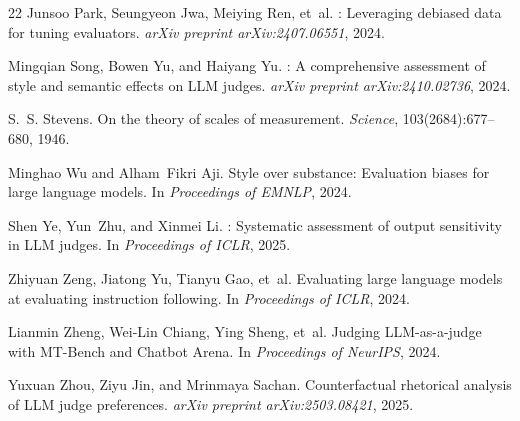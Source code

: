 \documentclass[11pt,a4paper]{article}
\begin{document}
\begin{thebibliography}{22}
Junsoo Park, Seungyeon Jwa, Meiying Ren, et~al.
: Leveraging debiased data for tuning evaluators.
\newblock \emph{arXiv preprint arXiv:2407.06551}, 2024.

Mingqian Song, Bowen Yu, and Haiyang Yu.
: A comprehensive assessment of style and semantic effects on LLM judges.
\newblock \emph{arXiv preprint arXiv:2410.02736}, 2024.

S.~S. Stevens.
\newblock On the theory of scales of measurement.
\newblock \emph{Science}, 103(2684):677--680, 1946.

Minghao Wu and Alham~Fikri Aji.
\newblock Style over substance: Evaluation biases for large language models.
\newblock In \emph{Proceedings of EMNLP}, 2024.

Shen Ye, Yun~Zhu, and Xinmei Li.
: Systematic assessment of output sensitivity in LLM judges.
\newblock In \emph{Proceedings of ICLR}, 2025.

Zhiyuan Zeng, Jiatong Yu, Tianyu Gao, et~al.
\newblock Evaluating large language models at evaluating instruction following.
\newblock In \emph{Proceedings of ICLR}, 2024.

Lianmin Zheng, Wei-Lin Chiang, Ying Sheng, et~al.
\newblock Judging {LLM}-as-a-judge with {MT-Bench} and {Chatbot Arena}.
\newblock In \emph{Proceedings of NeurIPS}, 2024.

Yuxuan Zhou, Ziyu Jin, and Mrinmaya Sachan.
\newblock Counterfactual rhetorical analysis of LLM judge preferences.
\newblock \emph{arXiv preprint arXiv:2503.08421}, 2025.

\end{thebibliography}
\end{document}
